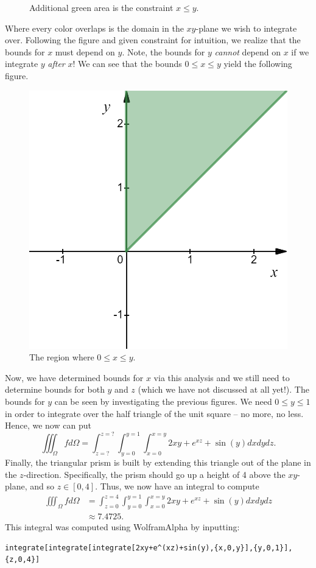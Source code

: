 \documentclass[12pt]{article} %
\begin{document}
\begin{solution}
\begin{figure}[H]
    \caption{Additional green area is the constraint $x\leq y$.}
\end{figure}
Where every color overlaps is the domain in the $xy$-plane we wish to integrate over. Following the figure and given constraint for intuition, we realize that the bounds for $x$ must depend on $y$. Note, the bounds for $y$ \emph{cannot} depend on $x$ if we integrate $y$ \emph{after} $x$! We can see that the bounds $0\leq x \leq y$ yield the following figure.
\begin{figure}[H]
    \centering
    \includegraphics[width=.6\textwidth]{figures/bounds_3.png}
    \caption{The region where $0\leq x\leq y$.}
\end{figure}
Now, we have determined bounds for $x$ via this analysis and we still need to determine bounds for both $y$ and $z$ (which we have not discussed at all yet!). The bounds for $y$ can be seen by investigating the previous figures. We need $0\leq y \leq 1$ in order to integrate over the half triangle of the unit square -- no more, no less. Hence, we now can put
\[
\iiint_{\Omega} f d\Omega = \int_{z=?}^{z=?} \int_{y=0}^{y=1} \int_{x=0}^{x=y} 2xy +e^{xz} + \sin(y) dxdydz.
\]
Finally, the triangular prism is built by extending this triangle out of the plane in the $z$-direction. Specifically, the prism should go up a height of 4 above the $xy$-plane, and so $z \in [0,4]$. Thus, we now have an integral to compute
\begin{align*}
\iiint_{\Omega} f d\Omega &= \int_{z=0}^{z=4} \int_{y=0}^{y=1} \int_{x=0}^{x=y} 2xy +e^{xz} + \sin(y) dxdydz\\
&\approx 7.4725.
\end{align*}
This integral was computed using WolframAlpha by inputting:
\begin{verbatim}
integrate[integrate[integrate[2xy+e^(xz)+sin(y),{x,0,y}],{y,0,1}],{z,0,4}]
\end{verbatim}
\end{solution}
\end{document}
